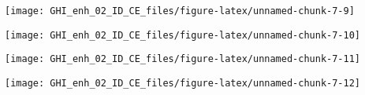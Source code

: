 \documentclass[
  10pt,
  a4paper,oneside]{article}
\newenvironment{Shaded}{\begin{snugshade}}{\end{snugshade}}
\newcommand{\FunctionTok}[1]{\textcolor[rgb]{0.13,0.29,0.53}{\textbf{#1}}}
\newcommand{\NormalTok}[1]{#1}
\newcommand{\SpecialCharTok}[1]{\textcolor[rgb]{0.81,0.36,0.00}{\textbf{#1}}}
\begin{document}
\begin{center}\texttt{[image: GHI\_enh\_02\_ID\_CE\_files/figure-latex/unnamed-chunk-7-9]} \end{center}

\begin{Shaded}
\end{Shaded}

\begin{center}\texttt{[image: GHI\_enh\_02\_ID\_CE\_files/figure-latex/unnamed-chunk-7-10]} \end{center}

\begin{Shaded}
\end{Shaded}

\begin{center}\texttt{[image: GHI\_enh\_02\_ID\_CE\_files/figure-latex/unnamed-chunk-7-11]} \end{center}

\begin{Shaded}
\end{Shaded}

\begin{center}\texttt{[image: GHI\_enh\_02\_ID\_CE\_files/figure-latex/unnamed-chunk-7-12]} \end{center}
\end{document}
